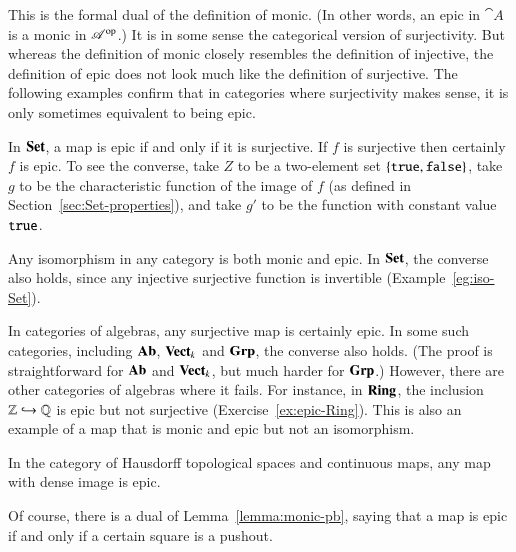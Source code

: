 This is the formal dual of the definition of monic.  (In other words, an
epic in $\cat{A}$ is a monic in $\mathscr{A}^{\mathrm{op}}$.)  It is in some sense the
categorical version of surjectivity.  But whereas the definition of monic
closely resembles the definition of injective, the definition of epic does
not look much like the definition of surjective.%
%
%
%
The following examples confirm that in categories where surjectivity makes
sense, it is only sometimes equivalent to being epic.

\begin{example}        
In $\mathbf{Set}$, a map is epic%
%
%
if and only if it is surjective.  If $f$ is surjective then certainly $f$
is epic.  To see the converse, take $Z$ to be a two-element set $\{ \texttt{true},
\texttt{false} \}$, take $g$ to be the characteristic function of the image of $f$
(as defined in Section~\ref{sec:Set-properties}), and take $g'$ to be the
function with constant value $\texttt{true}$.

Any isomorphism in any category is both monic and epic.  In $\mathbf{Set}$, the
converse also holds, since any injective surjective function is invertible
(Example~\ref{eg:iso-Set}). 
\end{example}

\begin{example}
\label{eg:epic-alg}
In categories of algebras, any surjective map is certainly epic.  In some
such categories, including $\mathbf{Ab}$, $\mathbf{Vect}_k$%
%
%
and $\mathbf{Grp}$,%
%
%
the converse also holds.  (The proof is straightforward for $\mathbf{Ab}$ and
$\mathbf{Vect}_k$, but much harder for $\mathbf{Grp}$.)  However, there are other
categories of algebras where it fails.  For instance, in $\mathbf{Ring}$,%
%
%
the inclusion $\mathbb{Z} \hookrightarrow \mathbb{Q}$ is epic but not surjective
(Exercise~\ref{ex:epic-Ring}).  This is also an example of a map that is
monic and epic but not an isomorphism.
\end{example}

\begin{example}
In the category of Hausdorff topological spaces%
%
%
%
and continuous maps, any map with dense image is epic.
\end{example}

Of course, there is a dual of Lemma~\ref{lemma:monic-pb}, saying that a map is
epic if and only if a certain square is a pushout.


